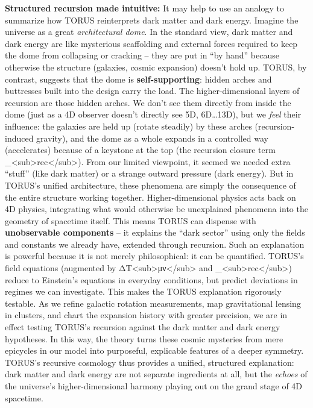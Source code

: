 \documentclass[
]{article}
\begin{document}
\textbf{Structured recursion made intuitive:} It may help to use an
analogy to summarize how TORUS reinterprets dark matter and dark energy.
Imagine the universe as a great \emph{architectural dome}. In the
standard view, dark matter and dark energy are like mysterious
scaffolding and external forces required to keep the dome from
collapsing or cracking -- they are put in ``by hand'' because otherwise
the structure (galaxies, cosmic expansion) doesn't hold up. TORUS, by
contrast, suggests that the dome is \textbf{self-supporting}: hidden
arches and buttresses built into the design carry the load. The
higher-dimensional layers of recursion are those hidden arches. We don't
see them directly from inside the dome (just as a 4D observer doesn't
directly see 5D, 6D\ldots13D), but we \emph{feel} their influence: the
galaxies are held up (rotate steadily) by these arches
(recursion-induced gravity), and the dome as a whole expands in a
controlled way (accelerates) because of a keystone at the top (the
recursion closure term
\Lambda\_\textless sub\textgreater rec\textless/sub\textgreater). From our
limited viewpoint, it seemed we needed extra ``stuff'' (like dark
matter) or a strange outward pressure (dark energy). But in TORUS's
unified architecture, these phenomena are simply the consequence of the
entire structure working together. Higher-dimensional physics acts back
on 4D physics, integrating what would otherwise be unexplained phenomena
into the geometry of spacetime itself\hspace{0pt}. This means TORUS can
dispense with \textbf{unobservable components} -- it explains the ``dark
sector'' using only the fields and constants we already have, extended
through recursion. Such an explanation is powerful because it is not
merely philosophical: it can be quantified. TORUS's field equations
(augmented by ΔT\textless sub\textgreater μν\textless/sub\textgreater{}
and \Lambda\_\textless sub\textgreater rec\textless/sub\textgreater) reduce to
Einstein's equations in everyday conditions, but predict deviations in
regimes we can investigate\hspace{0pt}. This makes the TORUS explanation
rigorously testable. As we refine galactic rotation measurements, map
gravitational lensing in clusters, and chart the expansion history with
greater precision, we are in effect testing TORUS's recursion against
the dark matter and dark energy hypotheses. In this way, the theory
turns these cosmic mysteries from mere epicycles in our model into
purposeful, explicable features of a deeper symmetry. TORUS's recursive
cosmology thus provides a unified, structured explanation: dark matter
and dark energy are not separate ingredients at all, but the
\emph{echoes} of the universe's higher-dimensional harmony playing out
on the grand stage of 4D spacetime.
\end{document}
